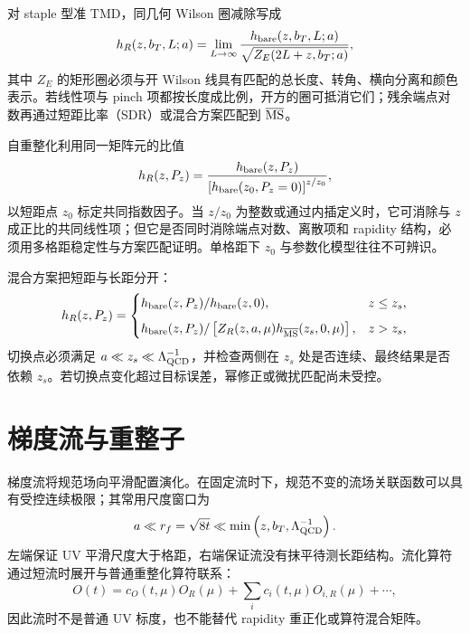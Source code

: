 对 staple 型准 TMD，同几何 Wilson 圈减除写成
\begin{equation}
  h_R(z,b_T,L;a)
  =\lim_{L\to\infty}
  \frac{h_{\rm bare}(z,b_T,L;a)}
  {\sqrt{Z_E(2L+z,b_T;a)}} ,
  \label{eq:wilson-loop-subtraction}
\end{equation}
其中 \(Z_E\) 的矩形圈必须与开 Wilson 线具有匹配的总长度、转角、横向分离和颜色表示。若线性项与 pinch 项都按长度成比例，开方的圈可抵消它们；残余端点对数再通过短距比率（SDR）或混合方案匹配到 \(\overline{\mathrm{MS}}\)。

自重整化利用同一矩阵元的比值
\begin{equation}
  h_R(z,P_z)
  =\frac{h_{\rm bare}(z,P_z)}
  {\left[h_{\rm bare}(z_0,P_z=0)\right]^{z/z_0}},
  \label{eq:self-renorm}
\end{equation}
以短距点 \(z_0\) 标定共同指数因子。当 $z/z_0$ 为整数或通过内插定义时，它可消除与 \(z\) 成正比的共同线性项；但它是否同时消除端点对数、离散项和 rapidity 结构，必须用多格距稳定性与方案匹配证明。单格距下 \(z_0\) 与参数化模型往往不可辨识。

混合方案把短距与长距分开：
\begin{equation}
  h_R(z,P_z)=
  \begin{cases}
    h_{\rm bare}(z,P_z)/h_{\rm bare}(z,0), & z\le z_s,\\[2mm]
    h_{\rm bare}(z,P_z)/
    \left[Z_R(z,a,\mu)h_{\overline{\mathrm{MS}}}(z_s,0,\mu)\right], & z>z_s,
  \end{cases}
  \label{eq:hybrid}
\end{equation}
切换点必须满足 \(a\ll z_s\ll\Lambda_{\rm QCD}^{-1}\)，并检查两侧在 \(z_s\) 处是否连续、最终结果是否依赖 \(z_s\)。若切换点变化超过目标误差，幂修正或微扰匹配尚未受控。

\section{梯度流与重整子}

梯度流将规范场向平滑配置演化。在固定流时下，规范不变的流场关联函数可以具有受控连续极限；其常用尺度窗口为
\begin{equation}
  a\ll r_f=\sqrt{8t}\ll
  \min\left(z,b_T,\Lambda_{\rm QCD}^{-1}\right).
  \label{eq:flow-window}
\end{equation}
左端保证 UV 平滑尺度大于格距，右端保证流没有抹平待测长距结构。流化算符通过短流时展开与普通重整化算符联系：
\begin{equation}
  O(t)=c_O(t,\mu)O_R(\mu)
  +\sum_i c_i(t,\mu)O_{i,R}(\mu)+\cdots ,
  \label{eq:flow-matching}
\end{equation}
因此流时不是普通 UV 标度，也不能替代 rapidity 重正化或算符混合矩阵。

